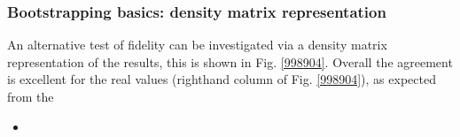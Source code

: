 \subsubsection{Bootstrapping basics: density matrix representation}

An alternative test of fidelity can be investigated via a density matrix representation of the results, this is shown in Fig. \ref{998904}. Overall the agreement is excellent for the real values (righthand column of Fig. \ref{998904}), as expected from the 

\begin{itemize}
\item 
\end{itemize}